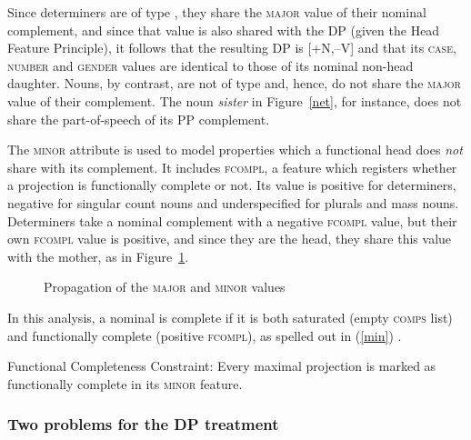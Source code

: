 \documentclass[output=paper,biblatex,babelshorthands,newtxmath,draftmode,colorlinks,citecolor=brown]{langscibook}
\begin{document}
\noindent
Since determiners are of type , they share the \textsc{major} value of their 
nominal complement, and since that value is 
also shared with the DP (given the Head Feature Principle), it follows that the resulting 
DP is [+N,--V] and that its \textsc{case}, \textsc{number} and \textsc{gender} values are 
identical to those of its nominal non-head daughter. 
Nouns, by contrast, are not of type  and, hence, do not share the 
\textsc{major} value of their complement. The noun \emph{sister} 
in Figure~\ref{net}, for instance, does not share the part-of-speech of its PP complement. 

The \textsc{minor} attribute is used to model properties which a functional head 
does {\em not} share with its complement. It includes \textsc{fcompl}, a feature which 
registers whether a projection is functionally complete or not. Its value is positive for 
determiners, negative for singular count nouns and underspecified for plurals and mass nouns.  
Determiners take a nominal complement with a negative \textsc{fcompl} value, but their 
own \textsc{fcompl} value is positive, and since they are the head, they share this value with 
the mother, as in Figure~\ref{netter}. 

\begin{figure}
\caption{\label{netter} Propagation of the \textsc{major} and \textsc{minor} values}
\end{figure}

In this analysis, a nominal is complete if it is both saturated 
(empty \textsc{comps} list) and functionally complete (positive \textsc{fcompl}), as 
spelled out in (\ref{min}) \citep[312]{Netter94}.

\begin{exe} 
\ex\label{min} Functional Completeness Constraint: Every maximal projection is marked  
      as functionally complete in its \textsc{minor} feature. 
\end{exe}



\subsubsection{Two problems for the DP treatment}  
\label{prob}
\end{document}
